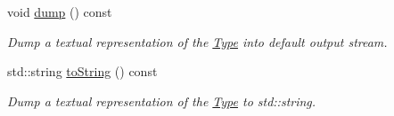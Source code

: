 \begin{DoxyCompactItemize}
void \hyperlink{structglow_1_1_type_a818731a6939730c60f885d686f495a22}{dump} () const
\begin{DoxyCompactList}\small\item\em Dump a textual representation of the \hyperlink{structglow_1_1_type}{Type} into default output stream. \end{DoxyCompactList}\item 
\mbox{\label{structglow_1_1_type_a1f160537a9daa986cae0d2c575b3c5ce}} 
std\+::string \hyperlink{structglow_1_1_type_a1f160537a9daa986cae0d2c575b3c5ce}{to\+String} () const
\begin{DoxyCompactList}\small\item\em Dump a textual representation of the \hyperlink{structglow_1_1_type}{Type} to std\+::string. \end{DoxyCompactList}\end{DoxyCompactItemize}
